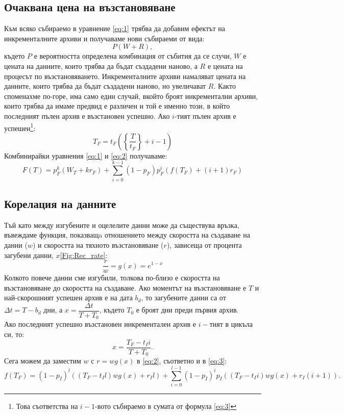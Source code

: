 \documentclass[11pt, a4paper]{article}
\theoremstyle{definition}
\begin{document}
			\subsection{Очаквана цена на възстановяване}
				Към всяко събираемо в уравнение \ref{eq:1} трябва да добавим ефектът на инкременталните архиви и получаваме нови събираеми от вида:
				$$
				P(W + R),
				$$
				където $P$ е вероятността определена комбинация от събития да се случи, $W$ е цената на данните, които трябва да бъдат създадени наново, а $R$ е цената на процесът по възстановяването. Инкременталните архиви намаляват цената на данните, които трябва да бъдат създадени наново, но увеличават $R$. Както споменахме по-горе, има само един случай, вкойто броят инкрементални архиви, които трябва да имаме предвид е различен и той е именно този, в който последният пълен архив е възстановен успешно. Ако $i$-тият пълен архив е успешен\footnote{Това съответства на $i-1$-вото събираемо в сумата от формула \ref{eq:3}}:
				$$
				T_F=t_F\left(\left\{ \frac{T}{t_F} \right\} + i - 1\right)
				$$
				Комбинирайки уравнения \ref{eq:1} и \ref{eq:2} получаваме:
				\begin{equation}\label{eq:3}
				F(T) = p_F^{k}(W_T+kr_F) + \displaystyle\sum_{i=0}^{k-1}(1-p_F)p_F^{i}\left(f(T_F) + (i+1)r_F\right)
				\end{equation}
			\subsection{Корелация на данните}
				Тъй като между изгубените и оцелелите данни може да съществува връзка, въвеждаме функция, показващa отношението между скоростта на създаване на данни ($w$) и скоростта на тяхното възстановяване ($r$), зависеща от процента загубени данни, $x$\ref{Fig:Rec_rate}:
				$$
				\dfrac{r}{w} = g(x) = e^{1-x}
				$$
				Колкото повече данни сме изгубили, толкова по-близо е скоростта на възстановяване до скоростта на създаване. Ако моментът на възстановяване е $T$ и най-скорошният успешен архив е на дата $b_d$, то загубените данни са от $\Delta t = T - b_d$ дни, а $x = \dfrac{\Delta t}{T + T_0}$, където $T_0$ е броят дни преди първия архив.\\
				Ако последният успешно възстановен инкрементален архив е $i-$тият в цикъла си, то:
				$$x = \dfrac{T_F-t_Ii}{T + T_0}.$$
				Сега можем да заместим $w$ с $r=wg(x)$ в \ref{eq:2}, съответно и в \ref{eq:3}:
				\begin{equation}
				\label{eq:4}
				f(T_F) = (1-p_I)^l((T_F-t_Il)wg(x) + r_Il) + \displaystyle \sum_{i=0}^{l-1} (1-p_I)^{i}p_I((T_F-t_Ii)wg(x) + r_I(i+1)).
				\end{equation}
				
\end{document}
